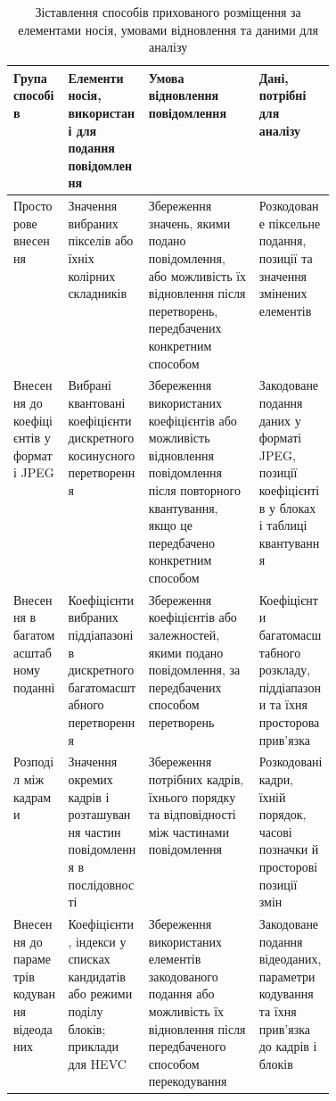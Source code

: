 \begin{landscape}
\begin{table}[H]
\caption{Зіставлення способів прихованого розміщення за елементами носія, умовами відновлення та даними для аналізу}
\label{tab:hiding_methods}
\centering
\small
\begingroup
{}
\setlength{\tabcolsep}{4pt}
\renewcommand{\arraystretch}{0.95}
\begin{tabularx}{\linewidth}{>{\raggedright\arraybackslash}p{0.17\linewidth}>{\raggedright\arraybackslash}p{0.25\linewidth}YY}
\toprule
\textbf{Група способів} & \textbf{Елементи носія, використані для подання повідомлення} & \textbf{Умова відновлення повідомлення} & \textbf{Дані, потрібні для аналізу} \\
\midrule
Просторове внесення & Значення вибраних пікселів або їхніх колірних складників & Збереження значень, якими подано повідомлення, або можливість їх відновлення після перетворень, передбачених конкретним способом & Розкодоване піксельне подання, позиції та значення змінених елементів \\
Внесення до коефіцієнтів у форматі JPEG & Вибрані квантовані коефіцієнти дискретного косинусного перетворення & Збереження використаних коефіцієнтів або можливість відновлення повідомлення після повторного квантування, якщо це передбачено конкретним способом & Закодоване подання даних у форматі JPEG, позиції коефіцієнтів у блоках і таблиці квантування \\
Внесення в багатомасштабному поданні & Коефіцієнти вибраних піддіапазонів дискретного багатомасштабного перетворення & Збереження коефіцієнтів або залежностей, якими подано повідомлення, за передбачених способом перетворень & Коефіцієнти багатомасштабного розкладу, піддіапазони та їхня просторова прив’язка \\
Розподіл між кадрами & Значення окремих кадрів і розташування частин повідомлення в послідовності & Збереження потрібних кадрів, їхнього порядку та відповідності між частинами повідомлення & Розкодовані кадри, їхній порядок, часові позначки й просторові позиції змін \\
Внесення до параметрів кодування відеоданих & Коефіцієнти, індекси у списках кандидатів або режими поділу блоків; приклади для HEVC & Збереження використаних елементів закодованого подання або можливість їх відновлення після передбаченого способом перекодування & Закодоване подання відеоданих, параметри кодування та їхня прив’язка до кадрів і блоків \\

\end{tabularx}
\end{table}
\end{landscape}
